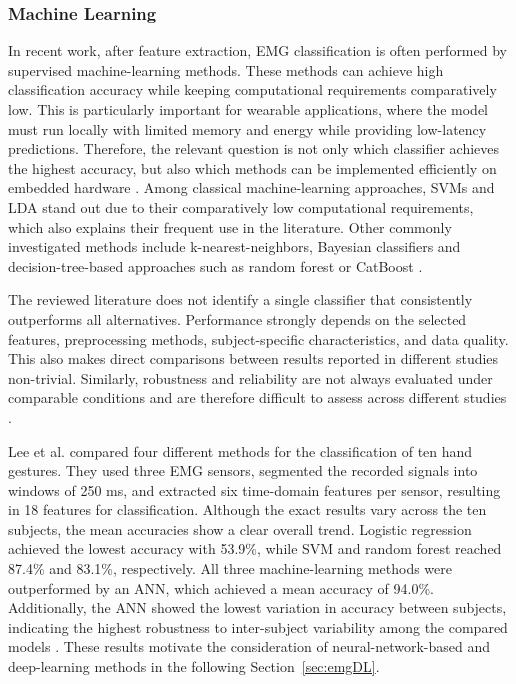 \subsubsection{Machine Learning}

In recent work, after feature extraction, EMG classification is often performed by supervised machine-learning methods. These methods can achieve high classification accuracy while keeping computational requirements comparatively low. This is particularly important for wearable applications, where the model must run locally with limited memory and energy while providing low-latency predictions. Therefore, the relevant question is not only which classifier achieves the highest accuracy, but also which methods can be implemented efficiently on embedded hardware \cite{castruita-lopez_electromyography_2025}.
Among classical machine-learning approaches, \acp{SVM} and \ac{LDA} stand out due to their comparatively low computational requirements, which also explains their frequent use in the literature.
Other commonly investigated methods include k-nearest-neighbors, Bayesian classifiers and decision-tree-based approaches such as random forest or CatBoost \cite{castruita-lopez_electromyography_2025}.

The reviewed literature does not identify a single classifier that consistently outperforms all alternatives. Performance strongly depends on the selected features, preprocessing methods, subject-specific characteristics, and data quality. This also makes direct comparisons between results reported in different studies non-trivial. Similarly, robustness and reliability are not always evaluated under comparable conditions and are therefore difficult to assess across different studies \cite{tamilvanan_comprehensive_2026}.

Lee et al. \cite{lee_electromyogram-based_2022} compared four different methods for the classification of ten hand gestures. They used three EMG sensors, segmented the recorded signals into windows of 250 ms, and extracted six time-domain features per sensor, resulting in 18 features for classification. Although the exact results vary across the ten subjects, the mean accuracies show a clear overall trend. Logistic regression achieved the lowest accuracy with 53.9\%, while \ac{SVM} and random forest reached 87.4\% and 83.1\%, respectively. All three machine-learning methods were outperformed by an \ac{ANN}, which achieved a mean accuracy of 94.0\%. Additionally, the \ac{ANN} showed the lowest variation in accuracy between subjects, indicating the highest robustness to inter-subject variability among the compared models \cite{lee_electromyogram-based_2022}. These results motivate the consideration of neural-network-based and deep-learning methods in the following Section~\ref{sec:emgDL}.


